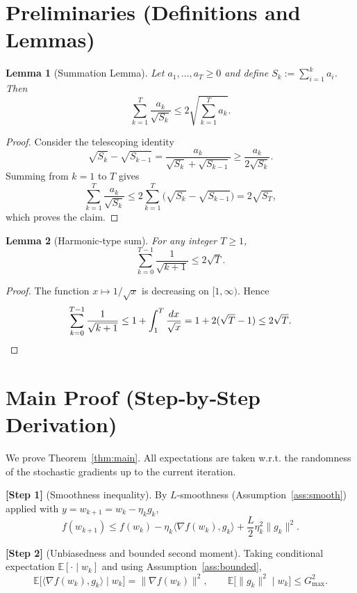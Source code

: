 \documentclass{article}
\newtheorem{lemma}{Lemma}
\begin{document}
\section*{Preliminaries (Definitions and Lemmas)}
\begin{lemma}[Summation Lemma]\label{lem:summation}
Let $a_1,\dots,a_T\ge0$ and define $S_k:=\sum_{i=1}^{k}a_i$. Then
\[
\sum_{k=1}^{T}\frac{a_k}{\sqrt{S_k}}\le 2\sqrt{\sum_{k=1}^{T}a_k}.
\]
\end{lemma}
\begin{proof}
Consider the telescoping identity
\[
\sqrt{S_k}-\sqrt{S_{k-1}}=\frac{a_k}{\sqrt{S_k}+\sqrt{S_{k-1}}}\ge
\frac{a_k}{2\sqrt{S_k}} .
\]
Summing from $k=1$ to $T$ gives
\[
\sum_{k=1}^{T}\frac{a_k}{\sqrt{S_k}}\le
2\sum_{k=1}^{T}\big(\sqrt{S_k}-\sqrt{S_{k-1}}\big)
=2\sqrt{S_T},
\]
which proves the claim. \qedhere
\end{proof}

\begin{lemma}[Harmonic‑type sum]\label{lem:harmonic}
For any integer $T\ge1$,
\[
\sum_{k=0}^{T-1}\frac{1}{\sqrt{k+1}}\le 2\sqrt{T}.
\]
\end{lemma}
\begin{proof}
The function $x\mapsto 1/\sqrt{x}$ is decreasing on $[1,\infty)$. Hence
\[
\sum_{k=0}^{T-1}\frac{1}{\sqrt{k+1}}
\le 1+\int_{1}^{T}\frac{dx}{\sqrt{x}}
=1+2(\sqrt{T}-1)\le 2\sqrt{T}.
\qedhere
\]
\end{proof}

\section*{Main Proof (Step‑by‑Step Derivation)}
We prove Theorem~\ref{thm:main}.  
All expectations are taken w.r.t. the randomness of the stochastic gradients up to the current iteration.

\bigskip
\noindent\textbf{[Step 1]} (Smoothness inequality).  
By $L$‑smoothness (Assumption~\ref{ass:smooth}) applied with $y=w_{k+1}=w_k-\eta_k g_k$,
\begin{equation}
f(w_{k+1})\le f(w_k)-\eta_k\langle\nabla f(w_k),g_k\rangle
+\frac{L}{2}\eta_k^{2}\|g_k\|^{2}. \label{eq:smooth}
\end{equation}

\noindent\textbf{[Step 2]} (Unbiasedness and bounded second moment).  
Taking conditional expectation $\mathbb{E}[\cdot\mid w_k]$ and using Assumption~\ref{ass:bounded},
\[
\mathbb{E}\big[\langle\nabla f(w_k),g_k\rangle\mid w_k\big]
= \|\nabla f(w_k)\|^{2},\qquad
\mathbb{E}\big[\|g_k\|^{2}\mid w_k\big]\le G_{\max}^{2}.
\]
\end{document}
